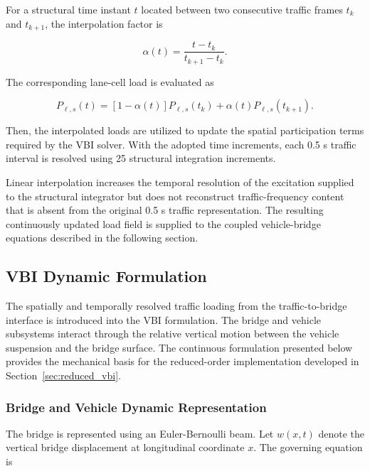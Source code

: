 \documentclass[journal]{IEEEtran}
\begin{document}
For a structural time instant $t$ located between two consecutive traffic frames $t_k$ and $t_{k+1}$, the interpolation factor is

\begin{equation}
\alpha(t)
=
\frac{t-t_k}
{t_{k+1}-t_k}.
\end{equation}

The corresponding lane-cell load is evaluated as

\begin{equation}
P_{\ell,s}(t)
=
\left[1-\alpha(t)\right]
P_{\ell,s}(t_k)
+
\alpha(t)
P_{\ell,s}(t_{k+1}).
\end{equation}

Then, the interpolated loads are utilized to update the spatial participation terms required by the VBI solver. With the adopted time increments, each 0.5 s traffic interval is resolved using 25 structural integration increments.

Linear interpolation increases the temporal resolution of the excitation supplied to the structural integrator but does not reconstruct traffic-frequency content that is absent from the original 0.5 s traffic representation. The resulting continuously updated load field is supplied to the coupled vehicle-bridge equations described in the following section.








\subsection{VBI Dynamic Formulation}
\label{sec:vbi_dynamic_formulation}

The spatially and temporally resolved traffic loading from the traffic-to-bridge interface is introduced into the VBI formulation. The
bridge and vehicle subsystems interact through the relative vertical motion
between the vehicle suspension and the bridge surface. The continuous
formulation presented below provides the mechanical basis for the reduced-order
implementation developed in Section~\ref{sec:reduced_vbi}.


\subsubsection{Bridge and Vehicle Dynamic Representation}

The bridge is represented using an Euler-Bernoulli beam. Let $w(x,t)$ denote the vertical bridge displacement at longitudinal coordinate $x$. The governing equation is
\end{document}
